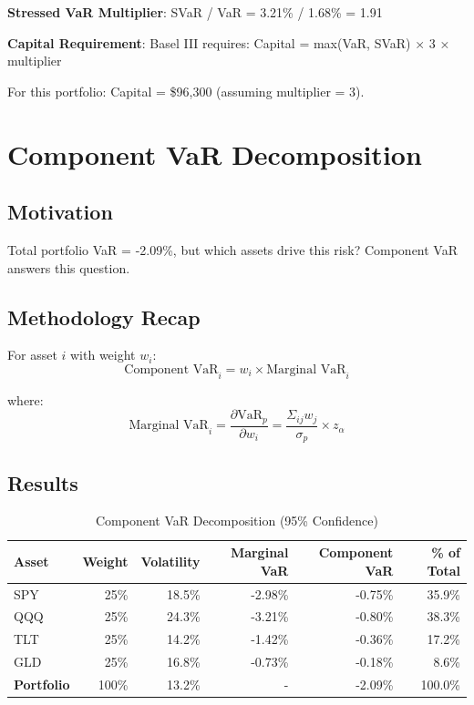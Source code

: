 \documentclass[12pt,a4paper]{article}
\begin{document}
\textbf{Stressed VaR Multiplier}: SVaR / VaR = 3.21\% / 1.68\% = 1.91

\textbf{Capital Requirement}: Basel III requires: Capital = max(VaR, SVaR) × 3 × multiplier

For this portfolio: Capital = \$96,300 (assuming multiplier = 3).

\newpage
\section{Component VaR Decomposition}

\subsection{Motivation}

Total portfolio VaR = -2.09\%, but which assets drive this risk? Component VaR answers this question.

\subsection{Methodology Recap}

For asset $i$ with weight $w_i$:
\begin{equation}
\text{Component VaR}_i = w_i \times \text{Marginal VaR}_i
\end{equation}

where:
\begin{equation}
\text{Marginal VaR}_i = \frac{\partial \text{VaR}_p}{\partial w_i} = \frac{\Sigma_{ij} w_j}{\sigma_p} \times z_\alpha
\end{equation}

\subsection{Results}

\begin{table}[H]
\centering
\begin{tabular}{@{}lrrrrr@{}}
\toprule
\textbf{Asset} & \textbf{Weight} & \textbf{Volatility} & \textbf{Marginal VaR} & \textbf{Component VaR} & \textbf{\% of Total} \\ \midrule
SPY & 25\% & 18.5\% & -2.98\% & -0.75\% & 35.9\% \\
QQQ & 25\% & 24.3\% & -3.21\% & -0.80\% & 38.3\% \\
TLT & 25\% & 14.2\% & -1.42\% & -0.36\% & 17.2\% \\
GLD & 25\% & 16.8\% & -0.73\% & -0.18\% & 8.6\% \\ \midrule
\textbf{Portfolio} & 100\% & 13.2\% & - & -2.09\% & 100.0\% \\ \bottomrule
\end{tabular}
\caption{Component VaR Decomposition (95\% Confidence)}
\end{table}
\end{document}
